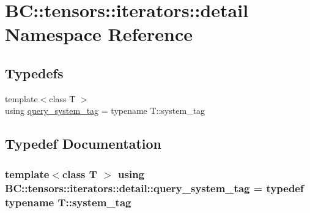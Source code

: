 \hypertarget{namespaceBC_1_1tensors_1_1iterators_1_1detail}{}\section{BC\+:\+:tensors\+:\+:iterators\+:\+:detail Namespace Reference}
\label{namespaceBC_1_1tensors_1_1iterators_1_1detail}
\subsection*{Typedefs}
\begin{DoxyCompactItemize}
\item 
{\footnotesize template$<$class T $>$ }\\using \hyperlink{namespaceBC_1_1tensors_1_1iterators_1_1detail_aa3c122c5f746d0b9aef7e6f24b520f13}{query\+\_\+system\+\_\+tag} = typename T\+::system\+\_\+tag
\end{DoxyCompactItemize}


\subsection{Typedef Documentation}
\subsubsection[{\texorpdfstring{query\+\_\+system\+\_\+tag}{query_system_tag}}]{\setlength{\rightskip}{0pt plus 5cm}template$<$class T $>$ using {\bf B\+C\+::tensors\+::iterators\+::detail\+::query\+\_\+system\+\_\+tag} = typedef typename T\+::system\+\_\+tag}\hypertarget{namespaceBC_1_1tensors_1_1iterators_1_1detail_aa3c122c5f746d0b9aef7e6f24b520f13}{}\label{namespaceBC_1_1tensors_1_1iterators_1_1detail_aa3c122c5f746d0b9aef7e6f24b520f13}
